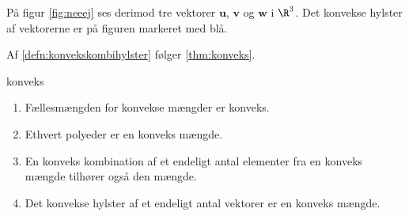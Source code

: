 %
På figur \ref{fig:neeej} ses derimod tre vektorer $\mathbf{u}$, $\mathbf{v}$ og $\mathbf{w}$ i $\R^3$. 
Det konvekse hylster af vektorerne er på figuren markeret med blå.
%

%
Af \ref{defn:konvekskombihylster} følger \ref{thm:konveks}.
%
\begin{thm}{}{konveks}
\begin{enumerate}[label=(\alph*)]
	\item Fællesmængden for konvekse mængder er konveks. 
	\item Ethvert polyeder er en konveks mængde.
	\item En konveks kombination af et endeligt antal elementer fra en konveks mængde tilhører også den mængde. 
	\item Det konvekse hylster af et endeligt antal vektorer er en konveks mængde. 
\end{enumerate}
\end{thm}
%
%
\newpage
